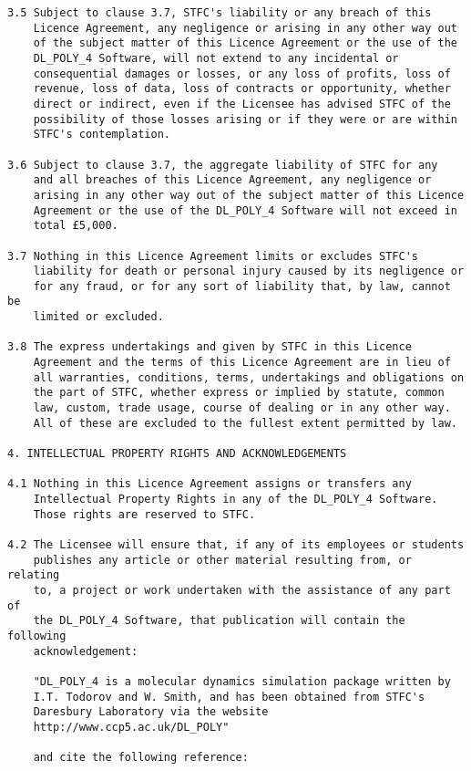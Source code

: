 \begin{verbatim}
3.5 Subject to clause 3.7, STFC's liability or any breach of this
    Licence Agreement, any negligence or arising in any other way out
    of the subject matter of this Licence Agreement or the use of the
    DL_POLY_4 Software, will not extend to any incidental or
    consequential damages or losses, or any loss of profits, loss of
    revenue, loss of data, loss of contracts or opportunity, whether
    direct or indirect, even if the Licensee has advised STFC of the
    possibility of those losses arising or if they were or are within
    STFC's contemplation.

3.6 Subject to clause 3.7, the aggregate liability of STFC for any
    and all breaches of this Licence Agreement, any negligence or
    arising in any other way out of the subject matter of this Licence
    Agreement or the use of the DL_POLY_4 Software will not exceed in
    total £5,000.

3.7 Nothing in this Licence Agreement limits or excludes STFC's
    liability for death or personal injury caused by its negligence or
    for any fraud, or for any sort of liability that, by law, cannot be
    limited or excluded.

3.8 The express undertakings and given by STFC in this Licence
    Agreement and the terms of this Licence Agreement are in lieu of
    all warranties, conditions, terms, undertakings and obligations on
    the part of STFC, whether express or implied by statute, common
    law, custom, trade usage, course of dealing or in any other way.
    All of these are excluded to the fullest extent permitted by law.

4. INTELLECTUAL PROPERTY RIGHTS AND ACKNOWLEDGEMENTS

4.1 Nothing in this Licence Agreement assigns or transfers any
    Intellectual Property Rights in any of the DL_POLY_4 Software.
    Those rights are reserved to STFC.

4.2 The Licensee will ensure that, if any of its employees or students
    publishes any article or other material resulting from, or relating
    to, a project or work undertaken with the assistance of any part of
    the DL_POLY_4 Software, that publication will contain the following
    acknowledgement:

    "DL_POLY_4 is a molecular dynamics simulation package written by
    I.T. Todorov and W. Smith, and has been obtained from STFC's
    Daresbury Laboratory via the website
    http://www.ccp5.ac.uk/DL_POLY"

    and cite the following reference:


\end{verbatim}
